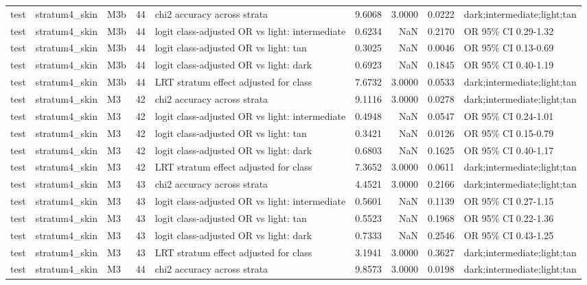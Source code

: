 \begin{tabular}{lllrlrrrl}
test & stratum4\_skin & M3b & 44 & chi2 accuracy across strata & 9.6068 & 3.0000 & 0.0222 & dark;intermediate;light;tan \\
test & stratum4\_skin & M3b & 44 & logit class-adjusted OR vs light: intermediate & 0.6234 & NaN & 0.2170 & OR 95\% CI 0.29-1.32 \\
test & stratum4\_skin & M3b & 44 & logit class-adjusted OR vs light: tan & 0.3025 & NaN & 0.0046 & OR 95\% CI 0.13-0.69 \\
test & stratum4\_skin & M3b & 44 & logit class-adjusted OR vs light: dark & 0.6923 & NaN & 0.1845 & OR 95\% CI 0.40-1.19 \\
test & stratum4\_skin & M3b & 44 & LRT stratum effect adjusted for class & 7.6732 & 3.0000 & 0.0533 & dark;intermediate;light;tan \\
test & stratum4\_skin & M3 & 42 & chi2 accuracy across strata & 9.1116 & 3.0000 & 0.0278 & dark;intermediate;light;tan \\
test & stratum4\_skin & M3 & 42 & logit class-adjusted OR vs light: intermediate & 0.4948 & NaN & 0.0547 & OR 95\% CI 0.24-1.01 \\
test & stratum4\_skin & M3 & 42 & logit class-adjusted OR vs light: tan & 0.3421 & NaN & 0.0126 & OR 95\% CI 0.15-0.79 \\
test & stratum4\_skin & M3 & 42 & logit class-adjusted OR vs light: dark & 0.6803 & NaN & 0.1625 & OR 95\% CI 0.40-1.17 \\
test & stratum4\_skin & M3 & 42 & LRT stratum effect adjusted for class & 7.3652 & 3.0000 & 0.0611 & dark;intermediate;light;tan \\
test & stratum4\_skin & M3 & 43 & chi2 accuracy across strata & 4.4521 & 3.0000 & 0.2166 & dark;intermediate;light;tan \\
test & stratum4\_skin & M3 & 43 & logit class-adjusted OR vs light: intermediate & 0.5601 & NaN & 0.1139 & OR 95\% CI 0.27-1.15 \\
test & stratum4\_skin & M3 & 43 & logit class-adjusted OR vs light: tan & 0.5523 & NaN & 0.1968 & OR 95\% CI 0.22-1.36 \\
test & stratum4\_skin & M3 & 43 & logit class-adjusted OR vs light: dark & 0.7333 & NaN & 0.2546 & OR 95\% CI 0.43-1.25 \\
test & stratum4\_skin & M3 & 43 & LRT stratum effect adjusted for class & 3.1941 & 3.0000 & 0.3627 & dark;intermediate;light;tan \\
test & stratum4\_skin & M3 & 44 & chi2 accuracy across strata & 9.8573 & 3.0000 & 0.0198 & dark;intermediate;light;tan \\

\end{tabular}
